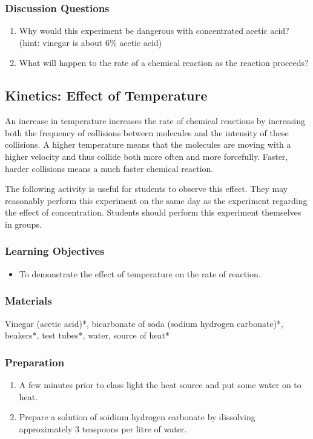 \subsubsection*{Discussion Questions}
\begin{enumerate}
\item{Why would this experiment be dangerous with concentrated acetic acid? (hint: vinegar is about 6\% acetic acid)}
\item{What will happen to the rate of a chemical reaction as the reaction proceeds?}
\end{enumerate}

\subsection{Kinetics: Effect of Temperature}

An increase in temperature increases the rate of chemical reactions by increasing both the frequency of collisions between molecules and the intensity of these collisions. A higher temperature means that the molecules are moving with a higher velocity and thus collide both more often and more forcefully. Faster, harder collisions means a much faster chemical reaction.

The following activity is useful for students to observe this effect. They may reasonably perform this experiment on the same day as the experiment regarding the effect of concentration. Students should perform this experiment themselves in groups.

\subsubsection*{Learning Objectives}
\begin{itemize}
\item{To demonstrate the effect of temperature on the rate of reaction.}
\end{itemize}

\subsubsection*{Materials}
Vinegar (acetic acid)*, bicarbonate of soda (sodium hydrogen carbonate)*, beakers*, test tubes*, water, source of heat*

\subsubsection*{Preparation}
\begin{enumerate}
\item{A few minutes prior to class light the heat source and put some water on to heat.}
\item{Prepare a solution of soidium hydrogen carbonate by dissolving approximately 3 teaspoons per litre of water.}
\end{enumerate}

